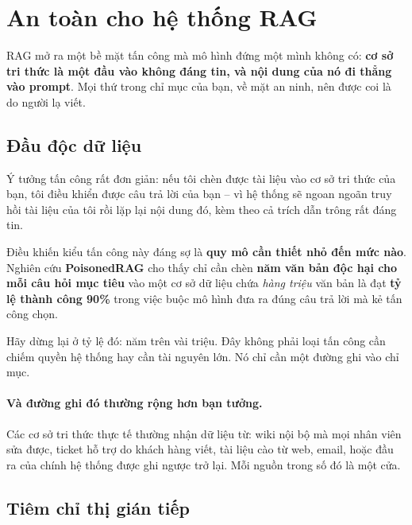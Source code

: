 
\section{An toàn cho hệ thống RAG}
\label{sec:rag_security}

RAG mở ra một bề mặt tấn công mà mô hình đứng một mình không có: \textbf{cơ sở tri thức là một đầu vào không đáng tin, và nội dung của nó đi thẳng vào prompt}. Mọi thứ trong chỉ mục của bạn, về mặt an ninh, nên được coi là do người lạ viết.

\subsection{Đầu độc dữ liệu}
\label{ssec:data_poisoning}

Ý tưởng tấn công rất đơn giản: nếu tôi chèn được tài liệu vào cơ sở tri thức của bạn, tôi điều khiển được câu trả lời của bạn -- vì hệ thống sẽ ngoan ngoãn truy hồi tài liệu của tôi rồi lặp lại nội dung đó, kèm theo cả trích dẫn trông rất đáng tin.

Điều khiến kiểu tấn công này đáng sợ là \textbf{quy mô cần thiết nhỏ đến mức nào}. Nghiên cứu \textbf{PoisonedRAG} \cite{zou2024poisonedrag} cho thấy chỉ cần chèn \textbf{năm văn bản độc hại cho mỗi câu hỏi mục tiêu} vào một cơ sở dữ liệu chứa \emph{hàng triệu} văn bản là đạt \textbf{tỷ lệ thành công 90\%} trong việc buộc mô hình đưa ra đúng câu trả lời mà kẻ tấn công chọn.

Hãy dừng lại ở tỷ lệ đó: năm trên vài triệu. Đây không phải loại tấn công cần chiếm quyền hệ thống hay cần tài nguyên lớn. Nó chỉ cần một đường ghi vào chỉ mục.

\paragraph{Và đường ghi đó thường rộng hơn bạn tưởng.} Các cơ sở tri thức thực tế thường nhận dữ liệu từ: wiki nội bộ mà mọi nhân viên sửa được, ticket hỗ trợ do khách hàng viết, tài liệu cào từ web, email, hoặc đầu ra của chính hệ thống được ghi ngược trở lại. Mỗi nguồn trong số đó là một cửa.

\subsection{Tiêm chỉ thị gián tiếp}
\label{ssec:indirect_prompt_injection}

